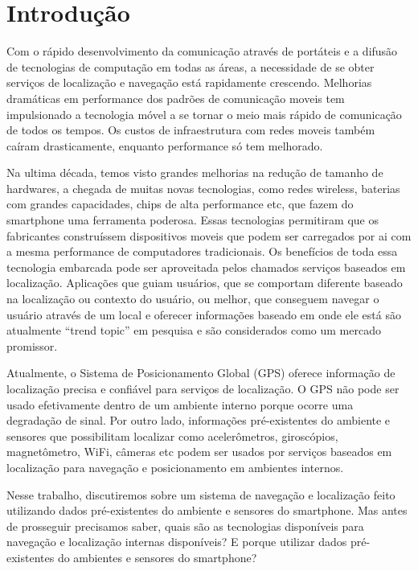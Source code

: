 \chapter{Introdução}

Com o rápido desenvolvimento da comunicação através de portáteis e a difusão de tecnologias de computação em todas as áreas, a necessidade de se obter serviços de localização e navegação está rapidamente crescendo. Melhorias dramáticas em performance dos padrões de comunicação moveis tem impulsionado a tecnologia móvel a se tornar o meio mais rápido de comunicação de todos os tempos. Os custos de infraestrutura com redes moveis também caíram drasticamente, enquanto performance só tem melhorado.

Na ultima década, temos visto grandes melhorias na redução de tamanho de hardwares, a chegada de muitas novas tecnologias, como redes wireless, baterias com grandes capacidades, chips de alta performance etc, que fazem do smartphone uma ferramenta poderosa. Essas tecnologias permitiram que os fabricantes construíssem dispositivos moveis que podem ser carregados por ai com a mesma performance de computadores tradicionais. Os benefícios de toda essa tecnologia embarcada pode ser aproveitada pelos chamados serviços baseados em localização. Aplicações que guiam usuários, que se comportam diferente baseado na localização ou contexto do usuário, ou melhor, que conseguem navegar o usuário através de um local e oferecer informações baseado em onde ele está são atualmente “trend topic”  em pesquisa e são considerados como um mercado promissor.

Atualmente, o Sistema de Posicionamento Global (GPS) oferece informação de localização precisa e confiável para serviços de localização. O GPS não pode ser usado efetivamente dentro de um ambiente interno porque ocorre uma degradação de sinal. Por outro lado, informações pré-existentes do ambiente e sensores que possibilitam localizar como acelerômetros, giroscópios, magnetômetro, WiFi, câmeras etc podem ser usados por serviços baseados em localização para navegação e posicionamento em ambientes internos.

Nesse trabalho, discutiremos sobre um sistema de navegação e localização feito utilizando dados pré-existentes do ambiente e sensores do smartphone. Mas antes de prosseguir precisamos saber, quais são as tecnologias disponíveis para navegação e localização internas disponíveis? E porque utilizar dados pré-existentes do ambientes e sensores do smartphone?



